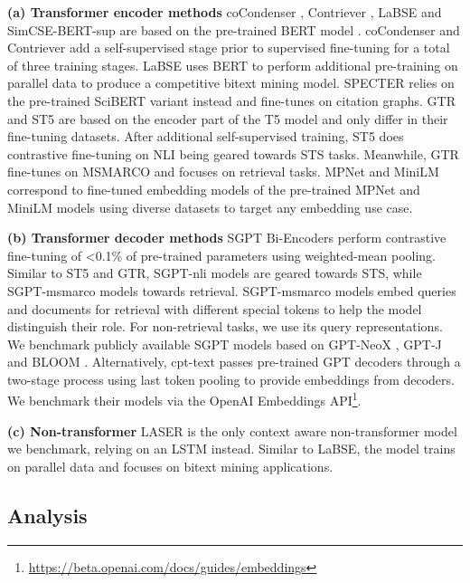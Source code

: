 \documentclass[11pt]{article}
\begin{document}
\textbf{(a) Transformer encoder methods} coCondenser \cite{gao2021unsupervised}, 
Contriever \cite{izacard2021towards}, LaBSE \cite{feng2020language} and SimCSE-BERT-sup \cite{gao2021simcse} are based on the pre-trained BERT model \cite{devlin2018bert}. coCondenser and Contriever add a self-supervised stage prior to supervised fine-tuning for a total of three training stages. LaBSE uses BERT to perform additional pre-training on parallel data to produce a competitive bitext mining model. SPECTER \cite{cohan2020specter} relies on the pre-trained SciBERT \cite{beltagy2019scibert} variant instead and fine-tunes on citation graphs. GTR \cite{ni2021large} and ST5 \cite{ni2021sentence} are based on the encoder part of the T5 model \cite{raffel2020exploring} and only differ in their fine-tuning datasets. After additional self-supervised training, ST5 does contrastive fine-tuning on NLI \cite{ni2021sentence, gao2021simcse} being geared towards STS tasks. Meanwhile, GTR fine-tunes on MSMARCO and focuses on retrieval tasks. MPNet and MiniLM correspond to fine-tuned embedding models \cite{reimers2019sentence} of the pre-trained MPNet \cite{song2020mpnet} and MiniLM \cite{wang2020minilm} models using diverse datasets to target any embedding use case. 

\textbf{(b) Transformer decoder methods} SGPT Bi-Encoders \cite{muennighoff2022sgpt} perform contrastive fine-tuning of <0.1\% of pre-trained parameters using weighted-mean pooling. Similar to ST5 and GTR, SGPT-nli models are geared towards STS, while SGPT-msmarco models towards retrieval. SGPT-msmarco models embed queries and documents for retrieval with different special tokens to help the model distinguish their role. For non-retrieval tasks, we use its query representations. We benchmark publicly available SGPT models based on GPT-NeoX \cite{gpt-neox}, GPT-J \cite{gpt-j} and BLOOM \cite{scao2022bloom}. Alternatively, cpt-text \cite{neelakantan2022text} passes pre-trained GPT decoders through a two-stage process using last token pooling to provide embeddings from decoders. We benchmark their models via the OpenAI Embeddings API\footnote{\url{https://beta.openai.com/docs/guides/embeddings}}.

\textbf{(c) Non-transformer} LASER \cite{heffernan2022bitext} is the only context aware non-transformer model we benchmark, relying on an LSTM \cite{hochreiter1997long} instead. Similar to LaBSE, the model trains on parallel data and focuses on bitext mining applications.

\subsection{Analysis}
\label{sec:analysis}
\end{document}
